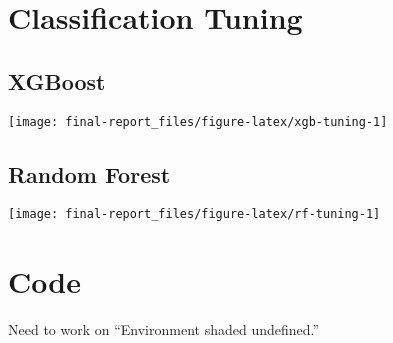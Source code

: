 \clearpage



\begin{appendix}
\clearpage
\appendix

\hypertarget{classification-tuning}{%
\section{\texorpdfstring{Classification Tuning
\label{app:tuning}}{Classification Tuning }}\label{classification-tuning}}

\hypertarget{xgboost}{%
\subsection{\texorpdfstring{XGBoost
\label{app:xgb-tuning}}{XGBoost }}\label{xgboost}}

\begin{center}\texttt{[image: final-report\_files/figure-latex/xgb-tuning-1]} \end{center}

\hypertarget{random-forest}{%
\subsection{\texorpdfstring{Random Forest
\label{app:rf-tuning}}{Random Forest }}\label{random-forest}}

\begin{center}\texttt{[image: final-report\_files/figure-latex/rf-tuning-1]} \end{center}

\hypertarget{code}{%
\section{\texorpdfstring{Code \label{app:code}}{Code }}\label{code}}

Need to work on ``Environment shaded undefined.''
\end{appendix}
